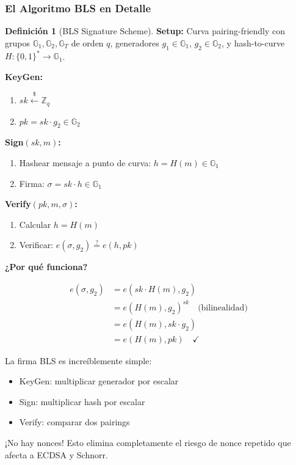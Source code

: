 \documentclass[11pt,a4paper,twoside,openright]{book}
\theoremstyle{definition}
\newtheorem{definition}{Definición}[chapter]
\theoremstyle{plain}
\theoremstyle{remark}
\newcommand{\Z}{\mathbb{Z}}
\newcommand{\G}{\mathbb{G}}
\begin{document}
\subsubsection{El Algoritmo BLS en Detalle}

\begin{definition}[BLS Signature Scheme]
\textbf{Setup:} Curva pairing-friendly con grupos $\G_1, \G_2, \G_T$ de orden $q$, generadores $g_1 \in \G_1$, $g_2 \in \G_2$, y hash-to-curve $H: \{0,1\}^* \to \G_1$.

\textbf{KeyGen:}
\begin{enumerate}
    \item $sk \xleftarrow{\$} \Z_q$
    \item $pk = sk \cdot g_2 \in \G_2$
\end{enumerate}

\textbf{Sign$(sk, m)$:}
\begin{enumerate}
    \item Hashear mensaje a punto de curva: $h = H(m) \in \G_1$
    \item Firma: $\sigma = sk \cdot h \in \G_1$
\end{enumerate}

\textbf{Verify$(pk, m, \sigma)$:}
\begin{enumerate}
    \item Calcular $h = H(m)$
    \item Verificar: $e(\sigma, g_2) \stackrel{?}{=} e(h, pk)$
\end{enumerate}
\end{definition}

\begin{mathnote}
\textbf{¿Por qué funciona?}

\begin{align}
e(\sigma, g_2) &= e(sk \cdot H(m), g_2) \\
               &= e(H(m), g_2)^{sk} \quad \text{(bilinealidad)} \\
               &= e(H(m), sk \cdot g_2) \\
               &= e(H(m), pk) \quad \checkmark
\end{align}
\end{mathnote}

\begin{intuicion}
La firma BLS es increíblemente simple:
\begin{itemize}
    \item KeyGen: multiplicar generador por escalar
    \item Sign: multiplicar hash por escalar
    \item Verify: comparar dos pairings
\end{itemize}

¡No hay nonces! Esto elimina completamente el riesgo de nonce repetido que afecta a ECDSA y Schnorr.
\end{intuicion}
\end{document}
